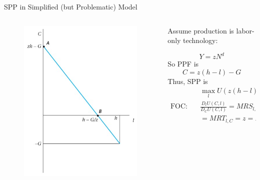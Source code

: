 \documentclass[11pt,aspectratio=169,usenames,dvipsnames]{beamer}
\begin{document}
\begin{frame}{SPP in Simplified (but Problematic) Model}
\label{slide:SPP_in_Simplified_Model}
    \begin{columns}
        \begin{column}{0.5\textwidth}
            \begin{figure}
                \includegraphics[width=.7\textwidth]{./figures/Figure_5_14.jpg}
            \end{figure}
        \end{column}
        \begin{column}{0.5\textwidth}
            Assume production is labor-only technology:

            \begin{equation*}
               Y = z N^{d}
            \end{equation*}
            So PPF is
            \begin{equation*}
               C = z( h-l ) - G
            \end{equation*}
            Thus, SPP is
            \begin{align*}
                    & \max_{l} U( z( h-l ) - G, l )
                \\
                \text{FOC:} \quad
                    & \frac{D_{l}U( C, l )}{D_{C}U( C, l )} = MRS_{l, C}
                \\
                    & = MRT_{l, C} = z = MPN
            \end{align*}
        \end{column}
    \end{columns}
\end{frame}
\end{document}
